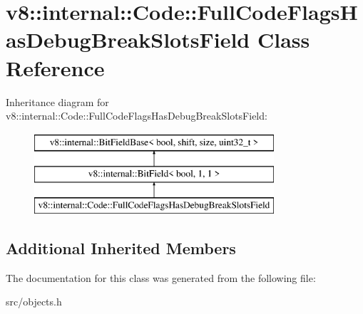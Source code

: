 \hypertarget{classv8_1_1internal_1_1_code_1_1_full_code_flags_has_debug_break_slots_field}{}\section{v8\+:\+:internal\+:\+:Code\+:\+:Full\+Code\+Flags\+Has\+Debug\+Break\+Slots\+Field Class Reference}
\label{classv8_1_1internal_1_1_code_1_1_full_code_flags_has_debug_break_slots_field}
Inheritance diagram for v8\+:\+:internal\+:\+:Code\+:\+:Full\+Code\+Flags\+Has\+Debug\+Break\+Slots\+Field\+:\begin{figure}[H]
\begin{center}
\leavevmode
\includegraphics[height=3.000000cm]{classv8_1_1internal_1_1_code_1_1_full_code_flags_has_debug_break_slots_field}
\end{center}
\end{figure}
\subsection*{Additional Inherited Members}


The documentation for this class was generated from the following file\+:\begin{DoxyCompactItemize}
\item 
src/objects.\+h\end{DoxyCompactItemize}
